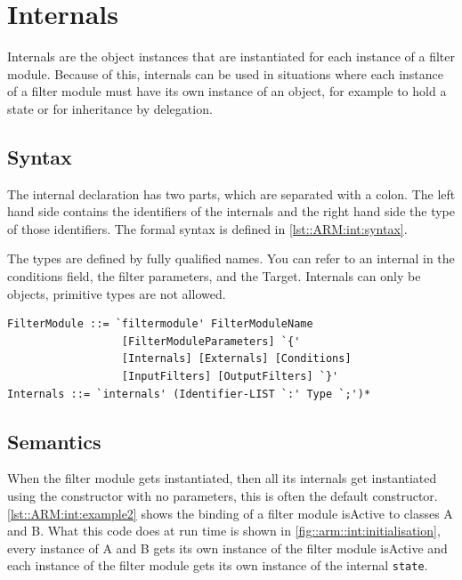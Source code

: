 %
%
%
%
\chapter{Internals}%
Internals are the object instances that are instantiated for each instance of a
filter module. Because of this, internals can be used in situations where
each instance of a filter module must have its own instance of an object, for example
to hold a state or for inheritance by delegation.

\section*{Syntax}
The internal declaration has two parts, which are separated with a colon. The
left hand side contains the identifiers of the internals and the right hand
side the type of those identifiers. 
The formal syntax is defined in \autoref{lst::ARM:int:syntax}.

The types are defined by fully qualified names.
You can refer to an internal in the conditions field,
the filter parameters, and the Target.
Internals can only be objects, primitive types are not allowed.
\begin{lstlisting}[caption = {Internals syntax}, label = lst::ARM:int:syntax,
style = listing, language = ebnf, float = tpb]
FilterModule ::= `filtermodule' FilterModuleName 
                  [FilterModuleParameters] `{'
                  [Internals] [Externals] [Conditions]
                  [InputFilters] [OutputFilters] `}'
Internals ::= `internals' (Identifier-LIST `:' Type `;')*
\end{lstlisting}

\section*{Semantics}
When the filter module gets instantiated, then 
all its internals get instantiated using the constructor with no parameters,
this is often the default constructor.
\autoref{lst::ARM:int:example2} shows the binding of a filter module isActive
to classes A and B. What this code does at run time is shown in \autoref{fig::arm::int:initialisation},
every instance of A and B gets its own instance of the filter module isActive
and each instance of the filter module gets its own instance of the internal \lstinline!state!.

